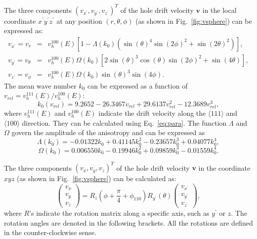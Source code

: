 The three components $(v_{x^{\prime}}, v_{y^{\prime}}, v_{z^{\prime}})^{T}$ of the hole drift velocity $\mathbf{v}$ in the local coordinate $x^{\prime}y^{\prime}z^{\prime}$ at any position $(r, \theta, \phi)$ (as shown in Fig.~\ref{fig:vsphere}) can be expressed as:
\begin{equation}
  \label{eq:vsphere}
  \begin{array}{rcl}
   v_{x^{\prime}} = v_{r} &=& v^{100}_{h}(E)[1-\Lambda(k_{0})(\sin(\theta)^{4}\sin(2\phi)^{2} + \sin(2\theta)^{2})],\\
   v_{y^{\prime}} = v_{\theta} &=& v^{100}_{h}(E)\Omega(k_{0})[2\sin(\theta)^{3}\cos(\theta)\sin(2\phi)^{2} + \sin(4\theta)],\\
    v_{z^{\prime}} = v_{\phi} &=& v^{100}_{h}(E)\Omega(k_{0})\sin(\theta)^{3}\sin(4\phi).
  \end{array}
\end{equation}
The mean wave number $k_{0}$ can be expressed as a function of $v_{rel} = v^{111}_{h}(E)/v^{100}_{h}(E)$:
\begin{equation}
  \label{eq:k0}
   k_{0}(v_{rel}) = 9.2652 - 26.3467v_{rel} + 29.6137v_{rel}^{2} - 12.3689v_{rel}^{3},
\end{equation}
where $v^{111}_{h}(E)$ and $v^{100}_{h}(E)$ indicate the drift velocity along the $\langle111\rangle$ and $\langle100\rangle$ direction. They can be calculated using Eq.~\ref{eq:para}. The function $\Lambda$ and $\Omega$ govern the amplitude of the anisotropy and can be expressed as
\begin{equation}
  \label{eq:lamb}
   \Lambda(k_{0}) = -0.01322k_{0} + 0.41145k_{0}^{2} - 0.23657k_{0}^{3} + 0.04077k_{0}^{4},
\end{equation}
\begin{equation}
  \label{eq:ome}
   \Omega(k_{0}) = 0.006550k_{0} - 0.19946k_{0}^{2} + 0.09859k_{0}^{3} - 0.01559k_{0}^{4}.
\end{equation}

The three components $(v_{x}, v_{y}, v_{z})^{T}$ of the hole drift velocity $\mathbf{v}$ in the coordinate $xyz$ (as shown in Fig.~\ref{fig:vsphere}) can be calculated as:
\begin{equation}
  \label{eq:v2v}  
  \left(
    \begin{array}{c}
      v_{x} \\ v_{y} \\ v_{z}
    \end{array}
\right) = R_{z}(\phi + \frac{\pi}{4} + \phi_{110}) R_{y^{\prime}}(\theta) \left( 
    \begin{array}{c}
      v_{x^{\prime}} \\ v_{y^{\prime}} \\ v_{z^{\prime}}
    \end{array} \right),
\end{equation}
where $R$'s indicate the rotation matrix along a specific axis, such as $y^{\prime}$ or $z$. The rotation angles are denoted in the following brackets. All the rotations are defined in the counter-clockwise sense.

